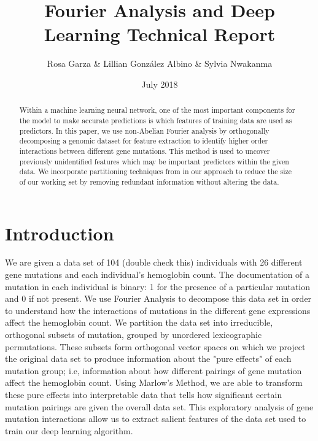 \documentclass{article}
\title{Fourier Analysis and Deep Learning Technical Report}
\author{Rosa Garza & Lillian González Albino & Sylvia Nwakanma}
\date{July 2018}
\theoremstyle{remark}
\theoremstyle{definition}
\begin{document}
\maketitle

\begin{abstract}
   Within a machine learning neural network, one of the most important components for the model to make accurate predictions is which features of training data are used as predictors. In this paper, we use non-Abelian Fourier analysis by orthogonally decomposing a genomic dataset for feature extraction to identify higher order interactions between different gene mutations. This method is used to uncover previously unidentified features which may be important predictors within the given data. We incorporate partitioning techniques from \cite{David} in our approach to reduce the size of our working set by removing redundant information without altering the data. 
\end{abstract}

\section{Introduction}
    We are given a data set of 104 (double check this) individuals with 26 different gene mutations and each individual's hemoglobin count. The documentation of a mutation in each individual is binary: 1 for the presence of a particular mutation and 0 if not present. We use Fourier Analysis to decompose this data set in order to understand how the interactions of mutations in the different gene expressions affect the hemoglobin count. We partition the data set into irreducible, orthogonal subsets of mutation, grouped by unordered lexicographic permutations. These subsets form orthogonal vector spaces on which we project the original data set to produce information about the "pure effects" of each mutation group; i.e, information about how different pairings of gene mutation affect the hemoglobin count. Using Marlow's Method, we are able to transform these pure effects into interpretable data that tells how significant certain mutation pairings are given the overall data set. This exploratory analysis of gene mutation interactions allow us to extract salient features of the data set used to train our deep learning algorithm. 
    
\end{document}

